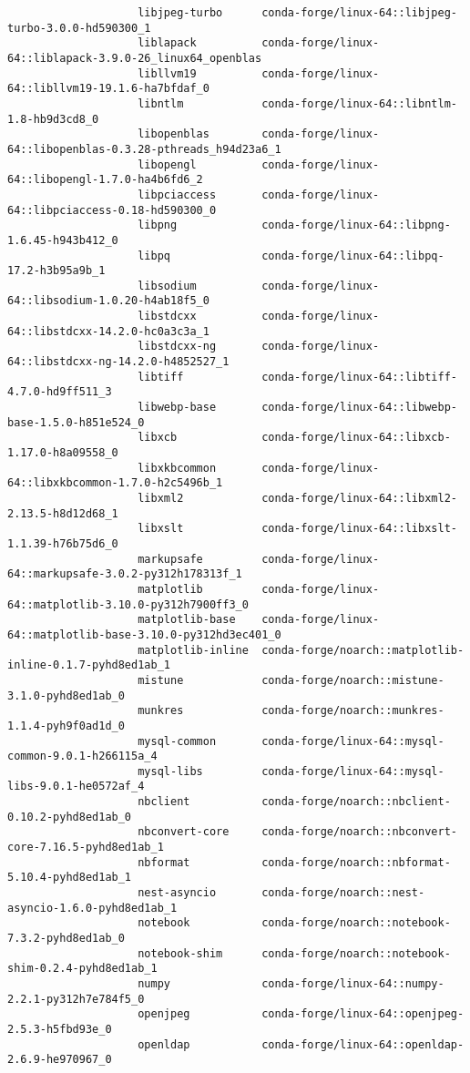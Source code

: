 \documentclass{article}
\begin{document}
\begin{enumerate}
\begin{itemize}
\begin{itemize}
\begin{itemize}
\begin{verbatim}
					libjpeg-turbo      conda-forge/linux-64::libjpeg-turbo-3.0.0-hd590300_1 
					liblapack          conda-forge/linux-64::liblapack-3.9.0-26_linux64_openblas 
					libllvm19          conda-forge/linux-64::libllvm19-19.1.6-ha7bfdaf_0 
					libntlm            conda-forge/linux-64::libntlm-1.8-hb9d3cd8_0 
					libopenblas        conda-forge/linux-64::libopenblas-0.3.28-pthreads_h94d23a6_1 
					libopengl          conda-forge/linux-64::libopengl-1.7.0-ha4b6fd6_2 
					libpciaccess       conda-forge/linux-64::libpciaccess-0.18-hd590300_0 
					libpng             conda-forge/linux-64::libpng-1.6.45-h943b412_0 
					libpq              conda-forge/linux-64::libpq-17.2-h3b95a9b_1 
					libsodium          conda-forge/linux-64::libsodium-1.0.20-h4ab18f5_0 
					libstdcxx          conda-forge/linux-64::libstdcxx-14.2.0-hc0a3c3a_1 
					libstdcxx-ng       conda-forge/linux-64::libstdcxx-ng-14.2.0-h4852527_1 
					libtiff            conda-forge/linux-64::libtiff-4.7.0-hd9ff511_3 
					libwebp-base       conda-forge/linux-64::libwebp-base-1.5.0-h851e524_0 
					libxcb             conda-forge/linux-64::libxcb-1.17.0-h8a09558_0 
					libxkbcommon       conda-forge/linux-64::libxkbcommon-1.7.0-h2c5496b_1 
					libxml2            conda-forge/linux-64::libxml2-2.13.5-h8d12d68_1 
					libxslt            conda-forge/linux-64::libxslt-1.1.39-h76b75d6_0 
					markupsafe         conda-forge/linux-64::markupsafe-3.0.2-py312h178313f_1 
					matplotlib         conda-forge/linux-64::matplotlib-3.10.0-py312h7900ff3_0 
					matplotlib-base    conda-forge/linux-64::matplotlib-base-3.10.0-py312hd3ec401_0 
					matplotlib-inline  conda-forge/noarch::matplotlib-inline-0.1.7-pyhd8ed1ab_1 
					mistune            conda-forge/noarch::mistune-3.1.0-pyhd8ed1ab_0 
					munkres            conda-forge/noarch::munkres-1.1.4-pyh9f0ad1d_0 
					mysql-common       conda-forge/linux-64::mysql-common-9.0.1-h266115a_4 
					mysql-libs         conda-forge/linux-64::mysql-libs-9.0.1-he0572af_4 
					nbclient           conda-forge/noarch::nbclient-0.10.2-pyhd8ed1ab_0 
					nbconvert-core     conda-forge/noarch::nbconvert-core-7.16.5-pyhd8ed1ab_1 
					nbformat           conda-forge/noarch::nbformat-5.10.4-pyhd8ed1ab_1 
					nest-asyncio       conda-forge/noarch::nest-asyncio-1.6.0-pyhd8ed1ab_1 
					notebook           conda-forge/noarch::notebook-7.3.2-pyhd8ed1ab_0 
					notebook-shim      conda-forge/noarch::notebook-shim-0.2.4-pyhd8ed1ab_1 
					numpy              conda-forge/linux-64::numpy-2.2.1-py312h7e784f5_0 
					openjpeg           conda-forge/linux-64::openjpeg-2.5.3-h5fbd93e_0 
					openldap           conda-forge/linux-64::openldap-2.6.9-he970967_0 

\end{verbatim}
\end{itemize}
\end{itemize}
\end{itemize}
\end{enumerate}
\end{document}
